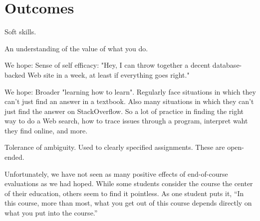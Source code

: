 \section{Outcomes}

Soft skills.

An understanding of the value of what you do.

We hope: Sense of self efficacy: "Hey, I can throw together a decent
database-backed Web site in a week, at least if everything goes right."

We hope: Broader "learning how to learn".  Regularly face situations
in which they can't just find an answer in a textbook.  Also many
situations in which they can't just find the answer on StackOverflow.
So a lot of practice in finding the right way to do a Web search,
how to trace issues through a program, interpret waht they find online,
and more.

Tolerance of ambiguity.  Used to clearly specified assignments.  These
are open-ended.

Unfortunately, we have not seen as many positive effects of
end-of-course evaluations as we had hoped.  While some students
consider the course the center of their education, others seem to
find it pointless.  As one student puts it, ``In this course, more
than most, what you get out of this course depends directly on what
you put into the course.''

